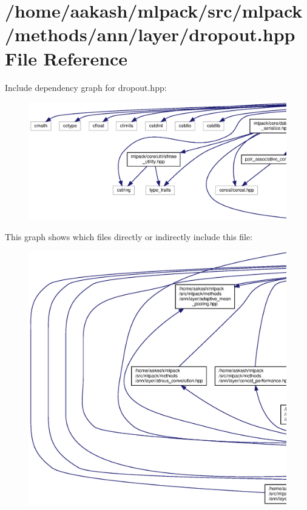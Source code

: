 \section{/home/aakash/mlpack/src/mlpack/methods/ann/layer/dropout.hpp File Reference}
\label{dropout_8hpp}
Include dependency graph for dropout.\+hpp\+:
\nopagebreak
\begin{figure}[H]
\begin{center}
\leavevmode
\includegraphics[width=350pt]{dropout_8hpp__incl}
\end{center}
\end{figure}
This graph shows which files directly or indirectly include this file\+:
\nopagebreak
\begin{figure}[H]
\begin{center}
\leavevmode
\includegraphics[width=350pt]{dropout_8hpp__dep__incl}
\end{center}
\end{figure}
